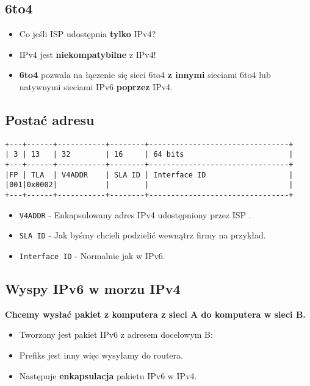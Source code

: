 \documentclass[../sk-egzamin.tex]{subfiles}
\begin{document}

\subsection*{6to4}
\begin{itemize}
    \item Co jeśli ISP udostępnia \textbf{tylko} IPv4?
    \item IPv4 jest \textbf{niekompatybilne} z IPv4!
    \item \textbf{6to4} pozwala na łączenie się sieci 6to4 \textbf{z innymi}
    sieciami 6to4 lub natywnymi sieciami IPv6 \textbf{poprzez} IPv4.
\end{itemize}

\subsection*{Postać adresu}
\begin{verbatim}
+---+------+-----------+--------+--------------------------------+
| 3 | 13   | 32        | 16     | 64 bits                        |
+---+------+-----------+--------+--------------------------------+
|FP | TLA  | V4ADDR    | SLA ID | Interface ID                   |
|001|0x0002|           |        |                                |
+---+------+-----------+--------+--------------------------------+
\end{verbatim}

\begin{itemize}
    \item \texttt{V4ADDR} - Enkapsulowany
    adres IPv4 udostępniony przez ISP .

    \item \texttt{SLA ID} - Jak byśmy chcieli podzielić wewnątrz firmy
    na przykład.

    \item \texttt{Interface ID} - Normalnie jak w IPv6.

\end{itemize}


\subsection*{Wyspy IPv6 w morzu IPv4}

\textbf{Chcemy wysłać pakiet z komputera z sieci A do komputera w sieci B.}
\begin{itemize}
    \item Tworzony jest pakiet IPv6 z adresem docelowym B:
    \item Prefiks jest inny więc wysyłamy do routera.
    \item Następuje \textbf{enkapsulacja} pakietu IPv6 w IPv4.
\end{itemize}
\end{document}
